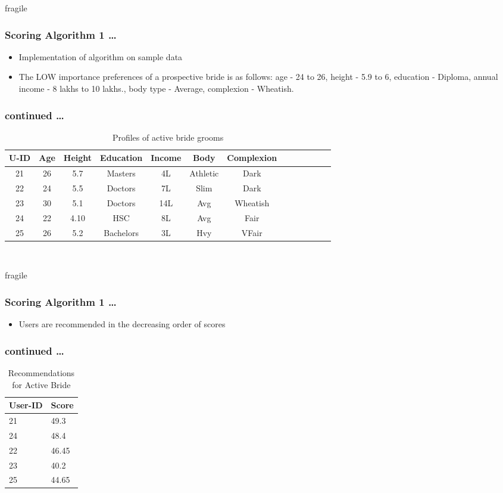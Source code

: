 \documentclass[10pt, compress]{beamer}
\begin{document}
\begin{frame}{fragile}
  \frametitle{Scoring Algorithm 1 \ldots}
 \begin{itemize}
 \item<1> Implementation of algorithm on sample data 
   \item<1> The LOW importance preferences of a prospective bride is as follows:  age - 24 to 26, height - 5.9 to 6, education - Diploma, annual income - 8 lakhs  to 10 lakhs., body type - Average, complexion - Wheatish.
    \end{itemize}
  \frametitle{continued \ldots}
\begin{table}[h!]
\caption{Profiles of active bride grooms}
\vspace{0.1in}
 \begin{tabular}{|c|c|c|c|c|c|c|c|c|c|c|c|c|}
 \hline
 U-ID & Age & Height  & Education  & Income & Body & Complexion\\
 \hline
 21 & 26 & 5.7  & Masters & 4L & Athletic & Dark\\
 \hline
 22 & 24 & 5.5  & Doctors & 7L & Slim & Dark \\
 \hline
 23 & 30 & 5.1 & Doctors  & 14L & Avg & Wheatish \\
 \hline
 24 & 22 & 4.10 & HSC & 8L & Avg & Fair\\
 \hline
 25 & 26 & 5.2 & Bachelors & 3L & Hvy & VFair\\
 \hline
\end{tabular}
\end{table}\\
  
\end{frame}

\begin{frame}{fragile}
  \frametitle{Scoring Algorithm 1 \ldots}
 \begin{itemize}
 \item<1> Users are recommended in the decreasing order of scores
    \end{itemize}
  \frametitle{continued \ldots}
\begin{table}[h!]
\centering
\caption{Recommendations for Active Bride}
\vspace{0.1in}
 \begin{tabular}{|m{3cm}|m{2em}|}
 \hline
 User-ID & Score\\
\hline
21 & 49.3\\
\hline
24 & 48.4\\
\hline
22& 46.45 \\
\hline
23 & 40.2 \\
\hline
25 & 44.65 \\
\hline
\end{tabular}
\end{table}
  
\end{frame}
\end{document}
